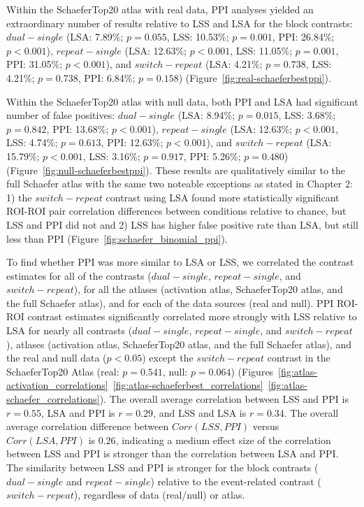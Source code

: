 \documentclass[phd,appendix,figures]{uithesis}
\begin{document}
Within the SchaeferTop20 atlas with real data, PPI analyses yielded an extraordinary number of results
relative to LSS and LSA for the block contrasts:
$dual - single$ (LSA: 7.89\%; $p = 0.055$, LSS: 10.53\%; $p = 0.001$, PPI: 26.84\%; $p < 0.001$),
$repeat - single$ (LSA: 12.63\%; $p < 0.001$, LSS: 11.05\%; $p = 0.001$, PPI: 31.05\%; $p < 0.001$), and
$switch - repeat$ (LSA: 4.21\%; $p = 0.738$, LSS: 4.21\%; $p = 0.738$, PPI: 6.84\%; $p = 0.158$) (Figure~\ref{fig:real-schaeferbestppi}).

Within the SchaeferTop20 atlas with null data, both PPI and LSA had significant number of false positives:
$dual - single$ (LSA: 8.94\%; $p = 0.015$, LSS: 3.68\%; $p = 0.842$, PPI: 13.68\%; $p < 0.001$),
$repeat - single$ (LSA: 12.63\%; $p < 0.001$, LSS: 4.74\%; $p = 0.613$, PPI: 12.63\%; $p < 0.001$), and
$switch - repeat$ (LSA: 15.79\%; $p < 0.001$, LSS: 3.16\%; $p = 0.917$, PPI: 5.26\%; $p = 0.480$) (Figure~\ref{fig:null-schaeferbestppi}).
These results are qualitatively similar to the full Schaefer atlas with the same two noteable exceptions
as stated in Chapter 2:
1) the $switch - repeat$ contrast using LSA found more statistically significant
ROI-ROI pair correlation differences between conditions relative to chance,
but LSS and PPI did not and
2) LSS has higher false positive rate than LSA, but still less than PPI (Figure~\ref{fig:schaefer_binomial_ppi}).

To find whether PPI was more similar to LSA or LSS, we correlated the contrast estimates for all of the contrasts
($dual - single$, $repeat - single$, and $switch - repeat$),
for all the atlases (activation atlas, SchaeferTop20 atlas, and the full Schaefer atlas), and
for each of the data sources (real and null).
PPI ROI-ROI contrast estimates significantly correlated more strongly with LSS relative to LSA
for nearly all contrasts ($dual - single$, $repeat - single$, and $switch - repeat$),
atlases (activation atlas, SchaeferTop20 atlas, and the full Schaefer atlas),
and the real and null data ($p < 0.05$) except the $switch - repeat$
contrast in the SchaeferTop20 Atlas (real: $p = 0.541$, null: $p = 0.064$)
(Figures~\ref{fig:atlas-activation_correlations}~\ref{fig:atlas-schaeferbest_correlations}~\ref{fig:atlas-schaefer_correlations}).
The overall average correlation between LSS and PPI is $r = 0.55$, LSA and PPI is $r = 0.29$,
and LSS and LSA is $r = 0.34$.
The overall average correlation difference between $Corr(LSS, PPI)$ versus $Corr(LSA, PPI)$ is $0.26$,
indicating a medium effect size of the correlation between LSS and PPI is stronger than the
correlation between LSA and PPI.
The similarity between LSS and PPI is stronger for the block contrasts ($dual - single$ and $repeat - single$)
relative to the event-related contrast ($switch - repeat$), regardless of data (real/null) or atlas.
\end{document}
